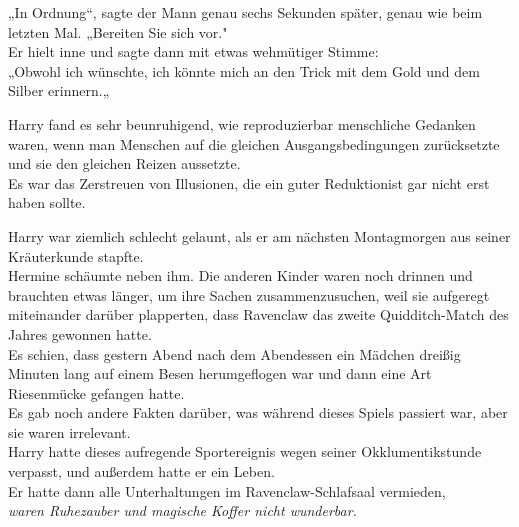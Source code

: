 {„In Ordnung“, sagte der Mann genau sechs Sekunden später, genau wie beim letzten Mal. „Bereiten Sie sich vor."\\ Er hielt inne und sagte dann mit etwas wehmütiger Stimme:\\ „Obwohl ich wünschte, ich könnte mich an den Trick mit dem Gold und dem Silber erinnern.„

Harry fand es sehr beunruhigend, wie reproduzierbar menschliche Gedanken waren, wenn man Menschen auf die gleichen Ausgangsbedingungen zurücksetzte und sie den gleichen Reizen aussetzte.\\ Es war das Zerstreuen von Illusionen, die ein guter Reduktionist gar nicht erst haben sollte.

Harry war ziemlich schlecht gelaunt, als er am nächsten Montagmorgen aus seiner Kräuterkunde stapfte.\\ Hermine schäumte neben ihm. Die anderen Kinder waren noch drinnen und brauchten etwas länger, um ihre Sachen zusammenzusuchen, weil sie aufgeregt miteinander darüber plapperten, dass Ravenclaw das zweite Quidditch-Match des Jahres gewonnen hatte.\\ Es schien, dass gestern Abend nach dem Abendessen ein Mädchen dreißig Minuten lang auf einem Besen herumgeflogen war und dann eine Art Riesenmücke gefangen hatte.\\ Es gab noch andere Fakten darüber, was während dieses Spiels passiert war, aber sie waren irrelevant.\\ Harry hatte dieses aufregende Sportereignis wegen seiner Okklumentikstunde verpasst, und außerdem hatte er ein Leben.\\ Er hatte dann alle Unterhaltungen im Ravenclaw-Schlafsaal vermieden,\\ \emph{waren Ruhezauber und magische Koffer nicht wunderbar.}

}
